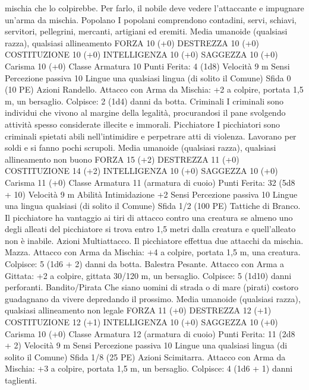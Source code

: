 \begin{multicols}{2}
mischia che lo colpirebbe. Per farlo, il nobile deve vedere
l’attaccante e impugnare un’arma da mischia.
Popolano
I popolani comprendono contadini, servi, schiavi,
servitori, pellegrini, mercanti, artigiani ed eremiti.
Media umanoide (qualsiasi razza), qualsiasi allineamento
FORZA 10 (+0)
DESTREZZA 10 (+0)
COSTITUZIONE 10 (+0)
INTELLIGENZA 10 (+0)
SAGGEZZA 10 (+0)
Carisma 10 (+0)
Classe Armatura 10
\hspace*{0pt}\hfill{Punti Ferita}: 4 (1d8)
Velocità 9 m
Sensi Percezione passiva 10
Lingue una qualsiasi lingua (di solito il Comune)
Sfida 0 (10 PE)
Azioni
Randello. Attacco con Arma da Mischia: +2 a colpire, portata
1,5 m, un bersaglio.
Colpisce: 2 (1d4) danni da botta.
Criminali
I criminali sono individui che vivono al margine della
legalità, procurandosi il pane svolgendo attività spesso
considerate illecite e immorali.
Picchiatore
I picchiatori sono criminali spietati abili nell’intimidire e
perpetrare atti di violenza. Lavorano per soldi e si fanno
pochi scrupoli.
Media umanoide (qualsiasi razza), qualsiasi allineamento non
buono
FORZA 15 (+2)
DESTREZZA 11 (+0)
COSTITUZIONE 14 (+2)
INTELLIGENZA 10 (+0)
SAGGEZZA 10 (+0)
Carisma 11 (+0)
Classe Armatura 11 (armatura di cuoio)
\hspace*{0pt}\hfill{Punti Ferita}: 32 (5d8 + 10)
Velocità 9 m
Abilità Intimidazione +2
Sensi Percezione passiva 10
Lingue una lingua qualsiasi (di solito il Comune)
Sfida 1/2 (100 PE)
Tattiche di Branco. Il picchiatore ha vantaggio ai tiri di attacco
contro una creatura se almeno uno degli alleati del picchiatore si
trova entro 1,5 metri dalla creatura e quell’alleato non è inabile.
Azioni
Multiattacco. Il picchiatore effettua due attacchi da mischia.
Mazza. Attacco con Arma da Mischia: +4 a colpire, portata 1,5
m, una creatura.
Colpisce: 5 (1d6 + 2) danni da botta.
Balestra Pesante. Attacco con Arma a Gittata: +2 a colpire,
gittata 30/120 m, un bersaglio.
Colpisce: 5 (1d10) danni perforanti.
Bandito/Pirata
Che siano uomini di strada o di mare (pirati) costoro
guadagnano da vivere depredando il prossimo.
Media umanoide (qualsiasi razza), qualsiasi allineamento non
legale
FORZA 11 (+0)
DESTREZZA 12 (+1)
COSTITUZIONE 12 (+1)
INTELLIGENZA 10 (+0)
SAGGEZZA 10 (+0)
Carisma 10 (+0)
Classe Armatura 12 (armatura di cuoio)
\hspace*{0pt}\hfill{Punti Ferita}: 11 (2d8 + 2)
Velocità 9 m
Sensi Percezione passiva 10
Lingue una qualsiasi lingua (di solito il Comune)
Sfida 1/8 (25 PE)
Azioni
Scimitarra. Attacco con Arma da Mischia: +3 a colpire, portata
1,5 m, un bersaglio.
Colpisce: 4 (1d6 + 1) danni taglienti.

\end{multicols}
